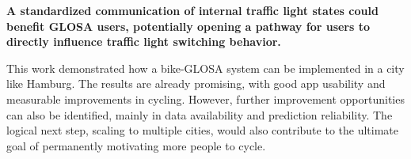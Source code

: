 \textbf{\color{cidarkblue}A standardized communication of internal traffic light states could benefit GLOSA users, potentially opening a pathway for users to directly influence traffic light switching behavior.}

This work demonstrated how a bike-GLOSA system can be implemented in a city like Hamburg. The results are already promising, with good app usability and measurable improvements in cycling. However, further improvement opportunities can also be identified, mainly in data availability and prediction reliability. The logical next step, scaling to multiple cities, would also contribute to the ultimate goal of permanently motivating more people to cycle.